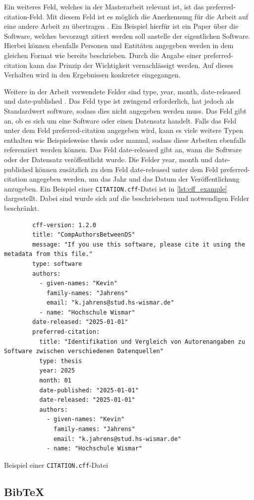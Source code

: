 Ein weiteres Feld, welches in der Masterarbeit relevant ist, ist das \glqq preferred-citation\grqq{}-Feld.
Mit diesem Feld ist es möglich die Anerkennung für die Arbeit auf eine andere Arbeit zu übertragen \autocite{druskat_citation_2021}.
Ein Beispiel hierfür ist ein Paper über die Software, welches bevorzugt zitiert werden soll anstelle der eigentlichen Software.
Hierbei können ebenfalls Personen und Entitäten angegeben werden in dem gleichen Format wie bereits beschrieben.
Durch die Angabe einer \glqq preferred-citation\grqq{} kann das Prinzip der Wichtigkeit vernachlässigt werden.
Auf dieses Verhalten wird in den Ergebnissen konkreter eingegangen.

Weitere in der Arbeit verwendete Felder sind \glqq type\grqq{}, \glqq year\grqq{}, \glqq month\grqq{}, \glqq date-released\grqq{} und \glqq date-published\grqq{} \autocite{druskat_citation_2021}.
Das Feld \glqq type\grqq{} ist zwingend erforderlich, hat jedoch als Standardwert \glqq software\grqq{}, sodass dies nicht angegeben werden muss.
Das Feld gibt an, ob es sich um eine Software oder einen Datensatz handelt.
Falls das Feld unter dem Feld \glqq preferred-citation\grqq{} angegeben wird, kann es viele weitere Typen enthalten wie Beispielsweise \glqq thesis\grqq{} oder \glqq manual\grqq{}, sodass diese Arbeiten ebenfalls referenziert werden können.
Das Feld \glqq date-released\grqq{} gibt an, wann die Software oder der Datensatz veröffentlicht wurde.
Die Felder \glqq year\grqq{}, \glqq month\grqq{} und \glqq date-published\grqq{} können zusätzlich zu dem Feld \glqq date-released\grqq{} unter dem Feld \glqq preferred-citation\grqq{} angegeben werden, um das Jahr und das Datum der Veröffentlichung anzugeben.
Ein Beispiel einer \texttt{CITATION.cff}-Datei ist in \autoref{lst:cff_example} dargestellt.
Dabei sind wurde sich auf die beschriebenen und notwendigen Felder beschränkt.

\begin{listing}
    \begin{verbatim}
        cff-version: 1.2.0
        title: "CompAuthorsBetweenDS"
        message: "If you use this software, please cite it using the metadata from this file."
        type: software
        authors:
          - given-names: "Kevin"
            family-names: "Jahrens"
            email: "k.jahrens@stud.hs-wismar.de"
          - name: "Hochschule Wismar"
        date-released: "2025-01-01"
        preferred-citation:
          title: "Identifikation und Vergleich von Autorenangaben zu Software zwischen verschiedenen Datenquellen"
          type: thesis
          year: 2025
          month: 01
          date-published: "2025-01-01"
          date-released: "2025-01-01"
          authors:
            - given-names: "Kevin"
              family-names: "Jahrens"
              email: "k.jahrens@stud.hs-wismar.de"
            - name: "Hochschule Wismar"
    \end{verbatim}
    \caption{Beispiel einer \texttt{CITATION.cff}-Datei}
    \label{lst:cff_example}
\end{listing}

\subsection{Bib\TeX{}}
\label{subsec:bibtex_format}
